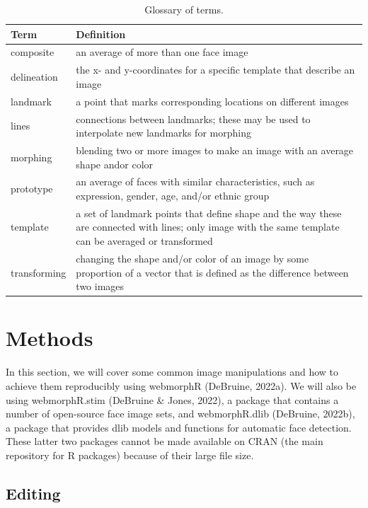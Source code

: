 \documentclass[
  man,floatsintext]{apa6}
\begin{document}
\begin{table}

\caption{\label{tab:glossary}Glossary of terms.}
\centering
\begin{tabular}[t]{l|l}
\hline
Term & Definition\\
\hline
composite & an average of more than one face image\\
\hline
delineation & the x- and y-coordinates for a specific template that describe an image\\
\hline
landmark & a point that marks corresponding locations on different images\\
\hline
lines & connections between landmarks; these may be used to interpolate new landmarks for morphing\\
\hline
morphing & blending two or more images to make an image with an average shape andor color\\
\hline
prototype & an average of faces with similar characteristics, such as expression, gender, age, and/or ethnic group\\
\hline
template & a set of landmark points that define shape and the way these are connected with lines; only image with the same template can be averaged or transformed\\
\hline
transforming & changing the shape and/or color of an image by some proportion of a vector that is  defined as the difference between two images\\
\hline
\end{tabular}
\end{table}

\hypertarget{methods}{%
\section{Methods}\label{methods}}

In this section, we will cover some common image manipulations and how to achieve them reproducibly using webmorphR (DeBruine, 2022a). We will also be using webmorphR.stim (DeBruine \& Jones, 2022), a package that contains a number of open-source face image sets, and webmorphR.dlib (DeBruine, 2022b), a package that provides dlib models and functions for automatic face detection. These latter two packages cannot be made available on CRAN (the main repository for R packages) because of their large file size.

\hypertarget{editing}{%
\subsection{Editing}\label{editing}}
\end{document}
